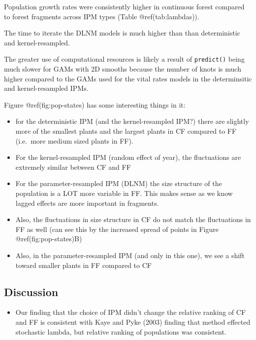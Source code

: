 \documentclass[
]{article}
\providecommand{\tightlist}{%
  \setlength{\itemsep}{0pt}\setlength{\parskip}{0pt}}\usepackage{longtable,booktabs,array}
\begin{document}
Population growth rates were consistently higher in continuous forest
compared to forest fragments across IPM types (Table @ref(tab:lambdas)).

The time to iterate the DLNM models is much higher than than
deterministic and kernel-resampled.

The greater use of computational resources is likely a result of
\texttt{predict()} being much slower for GAMs with 2D smooths because
the number of knots is much higher compared to the GAMs used for the
vital rates models in the determinsitic and kernel-resampled IPMs.

Figure @ref(fig:pop-states) has some interesting things in it:

\begin{itemize}
\item
  for the deterministic IPM (and the kernel-resampled IPM?) there are
  slightly more of the smallest plants and the largest plants in CF
  compared to FF (i.e.~more medium sized plants in FF).
\item
  For the kernel-resampled IPM (random effect of year), the fluctuations
  are extremely similar between CF and FF
\item
  For the parameter-resampled IPM (DLNM) the size structure of the
  population is a LOT more variable in FF. This makes sense as we know
  lagged effects are more important in fragments.
\item
  Also, the fluctuations in size structure in CF do not match the
  fluctuations in FF as well (can see this by the increased spread of
  points in Figure @ref(fig:pop-states)B)
\item
  Also, in the parameter-resampled IPM (and only in this one), we see a
  shift toward smaller plants in FF compared to CF
\end{itemize}

\hypertarget{discussion}{%
\subsection{Discussion}\label{discussion}}

\begin{itemize}
\tightlist
\item
  Our finding that the choice of IPM didn't change the relative ranking
  of CF and FF is consistent with Kaye and Pyke (2003) finding that
  method effected stochastic lambda, but relative ranking of populations
  was consistent.
\end{itemize}
\end{document}
